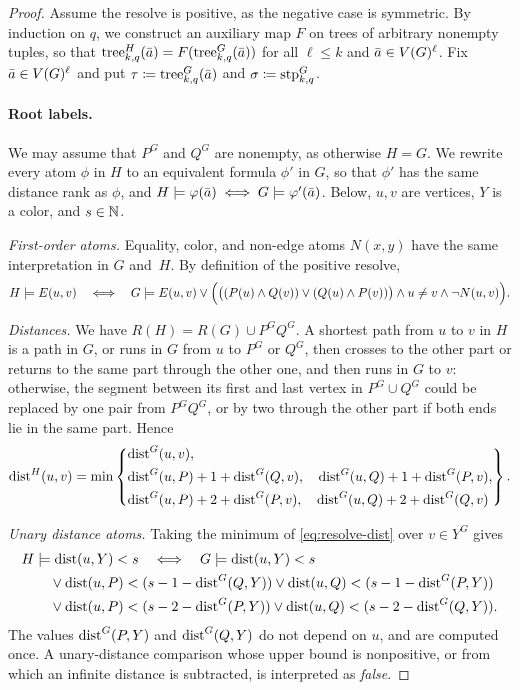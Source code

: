 \begin{proof}
Assume the resolve is positive, as the negative case is symmetric.
By induction on $q$, 
we construct an auxiliary map $F$ on trees of arbitrary nonempty tuples, so that $\mathrm{tree}^{H}_{k,q}(\bar a)=F(\mathrm{tree}^G_{k,q}(\bar a))$ for all $\ell\le k$ and $\bar a\in V(G)^\ell$.
Fix $\bar a \in V(G)^\ell$ and 
put $\tau\coloneqq\mathrm{tree}^G_{k,q}(\bar a)$ and $\sigma\coloneqq\textnormal{stp}^G_{k,q}$.



\paragraph{Root labels.}
We may assume that $P^G$ and $Q^G$ are nonempty, as otherwise $H=G$.
We rewrite every atom $\phi$ in $H$ to an equivalent formula $\phi'$ in $G$,
so that $\phi'$ has the same distance rank as $\phi$,
and $H\models\varphi(\bar a)\iff G\models\varphi'(\bar a)$.
Below, $u,v$ are vertices, $Y$ is a color, and $s\in\mathbb N$.

\emph{First-order atoms.}
Equality, color, and non-edge atoms $N(x,y)$ have the same interpretation in $G$ and~$H$.
By definition of the positive resolve,
\[
H\models E(u,v)
\quad\Longleftrightarrow\quad
G\models E(u,v)\lor\Bigl(\bigl((P(u)\land Q(v))\lor(Q(u)\land P(v))\bigr)\land u\ne v\land\lnot N(u,v)\Bigr).
\]

\emph{Distances.}
We have $R(H)=R(G)\cup P^GQ^G$.
A shortest path from $u$ to $v$ in $H$ is a path in $G$, or runs in $G$ from $u$ to $P^G$ or $Q^G$, then crosses to the other part or returns to the same part through the other one, and then runs in $G$ to $v$:
otherwise, the segment between its first and last vertex in $P^G\cup Q^G$ could be replaced by one pair from $P^GQ^G$, or by two through the other part if both ends lie in the same part.
Hence
\begin{equation}\label{eq:resolve-dist}
\mathrm{dist}^H(u,v)=\min\left\{
\begin{aligned}
&\mathrm{dist}^G(u,v),\\
&\mathrm{dist}^G(u,P)+1+\mathrm{dist}^G(Q,v),\quad \mathrm{dist}^G(u,Q)+1+\mathrm{dist}^G(P,v),\\
&\mathrm{dist}^G(u,P)+2+\mathrm{dist}^G(P,v),\quad \mathrm{dist}^G(u,Q)+2+\mathrm{dist}^G(Q,v)
\end{aligned}\right\}.
\end{equation}

\emph{Unary distance atoms.}
Taking the minimum of \eqref{eq:resolve-dist} over $v\in Y^G$ gives
\begin{align*}
&H\models\mathrm{dist}(u,Y)<s
\quad\Longleftrightarrow\quad
G\models\mathrm{dist}(u,Y)<s\\
&\qquad\lor\mathrm{dist}(u,P)<(s-1-\mathrm{dist}^G(Q,Y))\lor\mathrm{dist}(u,Q)<(s-1-\mathrm{dist}^G(P,Y))\\
&\qquad\lor\mathrm{dist}(u,P)<(s-2-\mathrm{dist}^G(P,Y))\lor\mathrm{dist}(u,Q)<(s-2-\mathrm{dist}^G(Q,Y)).
\end{align*}
The values $\mathrm{dist}^G(P,Y)$ and $\mathrm{dist}^G(Q,Y)$ do not depend on $u$, and are computed once. A unary-distance comparison whose upper bound is nonpositive, or from which an infinite distance is subtracted, is interpreted as \emph{false}.


\end{proof}
